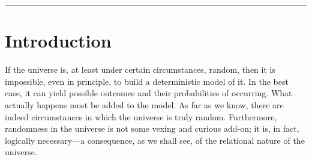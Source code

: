 \documentclass[11pt,a4paper]{article}
\theoremstyle{plain}
\theoremstyle{definition}
\theoremstyle{remark}
\begin{document}
\begin{abstract}
when continuous actualization events eliminate all unconstrained degrees of
freedom. The companion papers RAGC and RACI extend these results to gravity,
cosmology, and biological complexity; RAHC extends
the framework to the emergence of agentic intelligence. Recent results:
the Einstein field equations are the unique consistent macroscopic description
of the RA causal graph by Lovelock's theorem;
$c = l_P/t_P$ is derived as the maximum causal bandwidth rate and
$E = \gamma mc^2$ from discrete counting alone; the Causal Firewall
threshold is proved via the Erd\H{o}s-R\'{e}nyi percolation theorem;
and the Poisson-CSG generative measure makes the causal graph
dynamics local and environment-dependent for the first time in any
sequential-growth formulation. Key theorems have been formally verified
in Lean~4/Mathlib. A second Lean~4 file
(\texttt{RA\_AQFT\_Proofs\_v10.lean}) formalises the finite-dimensional AQFT
proof program and proves the frame-independence and Rindler stationarity
theorems; see the note on formal verification in the companion paper
RAGC.

\medskip\noindent
\textbf{Keywords:} Relational Quantum Mechanics \textperiodcentered{} Wave
Function Collapse \textperiodcentered{} Microcausality \textperiodcentered{}
Decoherence \textperiodcentered{} Determinism \textperiodcentered{} Phase Space
\textperiodcentered{} Objective Collapse \textperiodcentered{} Entanglement
Entropy \textperiodcentered{} Lean~4 Verification \textperiodcentered{}
Causal DAG \textperiodcentered{} Actualization Criterion \textperiodcentered{}
Kinematic Snap \textperiodcentered{} Poisson-CSG
\end{abstract}

\hrule
\vspace{8pt}

\section{Introduction}

If the universe is, at least under certain circumstances, random, then it is
impossible, even in principle, to build a deterministic model of it. In the best
case, it can yield possible outcomes and their probabilities of occurring. What
actually happens must be added to the model. As far as we know, there are indeed
circumstances in which the universe is truly random. Furthermore, randomness in
the universe is not some vexing and curious add-on; it is, in fact, logically
necessary---a consequence, as we shall see, of the relational nature of the
universe.
\end{document}
